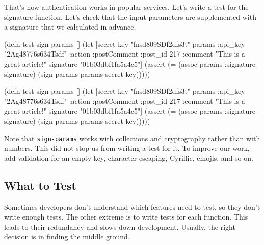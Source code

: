 
That's how authentication works in popular services. Let's write a test for the signature function. Let's check that the input parameters are supplemented with a signature that we calculated in advance.

\label{hmac-sha256}

\ifnarrow

\begin{english}
  \begin{clojure}
(defn test-sign-params []
  (let [secret-key "fnsd809SDf2dfs3t"
        params
        {:api_key "2Ag48776s634Tsdf"
         :action :postComment
         :post_id 217
         :comment
         "This is a great article!"}
        signature "01b03dbf1fa5a4c5"]
    (assert
      (= (assoc params
           :signature signature)
         (sign-params params
           secret-key)))))
  \end{clojure}
\end{english}

\else

\begin{english}
  \begin{clojure}
(defn test-sign-params []
  (let [secret-key "fnsd809SDf2dfs3t"
        params {:api_key "2Ag48776s634Tsdf"
                :action :postComment
                :post_id 217
                :comment "This is a great article!"}
        signature "01b03dbf1fa5a4c5"]
    (assert (= (assoc params :signature signature)
               (sign-params params secret-key)))))
  \end{clojure}
\end{english}

\fi

Note that \verb|sign-params| works with collections and cryptography rather than with numbers. This did not stop us from writing a test for it. To improve our work, add validation for an empty key, character escaping, Cyrillic, emojis, and so on.

\subsection{What to Test}

Sometimes developers don't understand which features need to test, so they don't write enough tests. The other extreme is to write tests for each function. This leads to their redundancy and slows down development. Usually, the right decision is in finding the middle ground.


